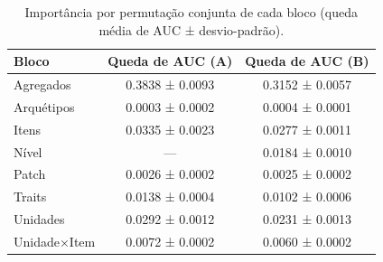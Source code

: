 \begin{table}[htbp]
\caption{Importância por permutação conjunta de cada bloco (queda média de AUC ± desvio-padrão).}
\label{tab:permutacao}
\centering
\small
\begin{tabular}{lcc}
\toprule
Bloco & Queda de AUC (A) & Queda de AUC (B) \\
\midrule
Agregados & 0.3838 ± 0.0093 & 0.3152 ± 0.0057 \\
Arquétipos & 0.0003 ± 0.0002 & 0.0004 ± 0.0001 \\
Itens & 0.0335 ± 0.0023 & 0.0277 ± 0.0011 \\
Nível & — & 0.0184 ± 0.0010 \\
Patch & 0.0026 ± 0.0002 & 0.0025 ± 0.0002 \\
Traits & 0.0138 ± 0.0004 & 0.0102 ± 0.0006 \\
Unidades & 0.0292 ± 0.0012 & 0.0231 ± 0.0013 \\
Unidade×Item & 0.0072 ± 0.0002 & 0.0060 ± 0.0002 \\
\bottomrule
\end{tabular}
\end{table}
